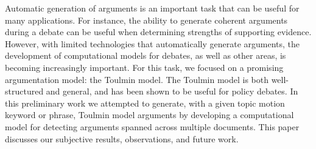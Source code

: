 Automatic generation of arguments is an important task that can be useful for many applications. For instance, the ability to generate coherent arguments during a debate can be useful when determining strengths of supporting evidence. However, with limited technologies that automatically generate arguments, the development of computational models for debates, as well as other areas, is becoming increasingly important. For this task, we focused on a promising argumentation model: the Toulmin model. The Toulmin model is both well-structured and general, and has been shown to be useful for policy debates. In this preliminary work we attempted to generate, with a given topic motion keyword or phrase, Toulmin model arguments by developing a computational model for detecting arguments spanned across multiple documents. This paper discusses our subjective results, observations, and future work.

